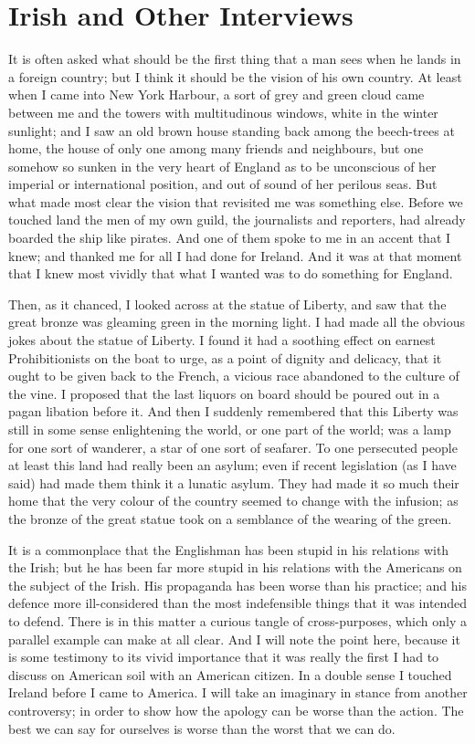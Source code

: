 \documentclass{book}
\begin{document}
\chapter{Irish and Other Interviews}
\label{chapter-3}
It is often asked what should be the first thing that a man sees when he lands in a foreign country; but I think it should be the vision of his own country. At least when I came into New York Harbour, a sort of grey and green cloud came between me and the towers with multitudinous windows, white in the winter sunlight; and I saw an old brown house standing back among the beech-trees at home, the house of only one among many friends and neighbours, but one somehow so sunken in the very heart of England as to be unconscious of her imperial or international position, and out of sound of her perilous seas. But what made most clear the vision that revisited me was something else. Before we touched land the men of my own guild, the journalists and reporters, had already boarded the ship like pirates. And one of them spoke to me in an accent that I knew; and thanked me for all I had done for Ireland. And it was at that moment that I knew most vividly that what I wanted was to do something for England.

Then, as it chanced, I looked across at the statue of Liberty, and saw that the great bronze was gleaming green in the morning light. I had made all the obvious jokes about the statue of Liberty. I found it had a soothing effect on earnest Prohibitionists on the boat to urge, as a point of dignity and delicacy, that it ought to be given back to the French, a vicious race abandoned to the culture of the vine. I proposed that the last liquors on board should be poured out in a pagan libation before it. And then I suddenly remembered that this Liberty was still in some sense enlightening the world, or one part of the world; was a lamp for one sort of wanderer, a star of one sort of seafarer. To one persecuted people at least this land had really been an asylum; even if recent legislation (as I have said) had made them think it a lunatic asylum. They had made it so much their home that the very colour of the country seemed to change with the infusion; as the bronze of the great statue took on a semblance of the wearing of the green.

It is a commonplace that the Englishman has been stupid in his relations with the Irish; but he has been far more stupid in his relations with the Americans on the subject of the Irish. His propaganda has been worse than his practice; and his defence more ill-considered than the most indefensible things that it was intended to defend. There is in this matter a curious tangle of cross-purposes, which only a parallel example can make at all clear. And I will note the point here, because it is some testimony to its vivid importance that it was really the first I had to discuss on American soil with an American citizen. In a double sense I touched Ireland before I came to America. I will take an imaginary in stance from another controversy; in order to show how the apology can be worse than the action. The best we can say for ourselves is worse than the worst that we can do.
\end{document}
